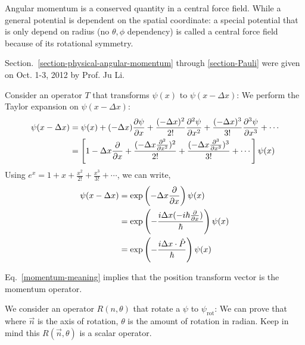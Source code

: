 \documentclass{school-22.101-notes}
\date{October 12, 2011}
\begin{document}
\maketitle

Angular momentum is a conserved quantity in a central force field. While a general potential is dependent on the spatial coordinate:
a special potential that is only depend on radius (no $\theta, \phi$ dependency) is called a central force field because of its rotational symmetry. 

Section.~\ref{section-physical-angular-momentum} through \ref{section-Pauli} were given on Oct. 1-3, 2012 by Prof. Ju Li. 

 Consider an operator $T$ that transforms $\psi(x)$ to $\psi(x-\Delta x)$: 
We perform the Taylor expansion on $\psi(x - \Delta x)$: 
\begin{align}
  \psi(x - \Delta x) &= \psi(x) + (-\Delta x) \frac{\partial \psi}{\partial x} + \frac{(-\Delta x)^2}{2!} \frac{\partial^{2} \psi}{\partial x ^{2}} + \frac{(-\Delta x)^3}{3!} \frac{\partial^{3} \psi}{\partial x ^{3}} + \cdots \\
  &= \left[ 1 - \Delta x \frac{\partial}{\partial x} + \frac{(-\Delta x \frac{\partial^{2} }{\partial x ^{2}})^2}{2!} + \frac{(-\Delta x \frac{\partial^{3} }{\partial x ^{3}})^3}{3!} + \cdots \right] \psi(x) 
\end{align}
Using $e^x = 1 + x + \frac{x^2}{2!} + \frac{x^3}{3!} + \cdots$, we can write, 
\begin{align}
  \psi(x - \Delta x) &= \exp \left( -\Delta x \frac{\partial}{\partial x} \right) \psi(x) \\
  &= \exp \left(- \frac{i \Delta x (-i \hbar \frac{\partial}{\partial x})}{\hbar} \right) \psi(x) \\
  &= \exp \left(-\frac{i \Delta x \cdot \hat{P} }{\hbar} \right) \psi(x) \label{momentum-meaning}
\end{align}

Eq.~\ref{momentum-meaning} implies that the position transform vector is the momentum operator. 


 We consider an operator $R(n, \theta)$ that rotate a $\psi$ to $\psi_{\mathrm{rot}}$: 
We can prove that 
where $\vec{n}$ is the axis of rotation, $\theta$ is the amount of rotation in radian.  Keep in mind this $R(\vec{n}, \theta)$ is a scalar operator. 
\end{document}
